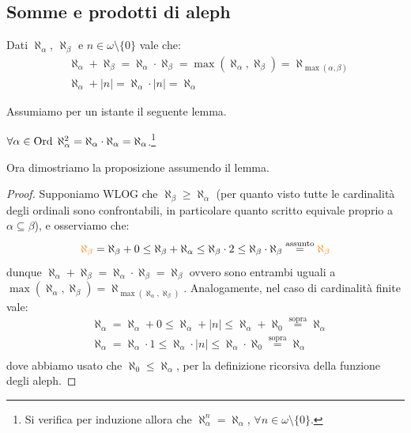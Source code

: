 \subsection{Somme e prodotti di aleph}

\begin{proposition}
	Dati $\aleph_\alpha$, $\aleph_\beta$ e $n \in \omega\setminus\{0\}$ vale che:
	\begin{align*}
		& \aleph_\alpha + \aleph_\beta = \aleph_\alpha \cdot\aleph_\beta = \max(\aleph_\alpha,\aleph_\beta) = \aleph_{\max(\alpha,\beta)} \\
		& \aleph_\alpha + |n| = \aleph_\alpha \cdot |n| = \aleph_\alpha
	\end{align*}
\end{proposition}

Assumiamo per un istante il seguente lemma.

\begin{lemma}[$\aleph_\alpha \cdot \aleph_\alpha = \aleph_\alpha$]
	$\forall \alpha \in \operatorname{Ord} \; \aleph_{\alpha}^2 = \aleph_\alpha \cdot \aleph_\alpha = \aleph_\alpha$.\footnote{Si verifica per induzione allora che $\aleph_\alpha^n = \aleph_\alpha$, $\forall n \in \omega\setminus\{0\}$.}
\end{lemma}

Ora dimostriamo la proposizione assumendo il lemma.

\begin{proof}
	Supponiamo WLOG che $\aleph_\beta \geq \aleph_\alpha$ (per quanto visto tutte le cardinalit\`a degli ordinali sono confrontabili, in particolare quanto scritto equivale proprio a $\alpha \subseteq \beta$), e osserviamo che:
	\[ \textcolor{orange}{\aleph_\beta} = \aleph_\beta + 0 \leq \aleph_\beta + \aleph_\alpha \leq \aleph_\beta \cdot 2 \leq \aleph_\beta \cdot \aleph_\beta \overset{\text{assunto}}{=} \textcolor{orange}{\aleph_\beta}
		\]
	dunque $\aleph_\alpha + \aleph_\beta = \aleph_\alpha \cdot\aleph_\beta = \aleph_\beta$ ovvero sono entrambi uguali a $ \max(\aleph_\alpha,\aleph_\beta) = \aleph_{\max(\aleph_\alpha,\aleph_\beta)}$.
	Analogamente, nel caso di cardinalit\`a finite vale:
	\begin{align*}
		&\aleph_\alpha = \aleph_\alpha + 0 \leq \aleph_\alpha + |n| \leq \aleph_\alpha + \aleph_0 \overset{\text{sopra}}{=} \aleph_\alpha \\
		&\aleph_\alpha = \aleph_\alpha \cdot 1 \leq \aleph_\alpha \cdot |n| \leq \aleph_\alpha \cdot \aleph_0 \overset{\text{sopra}}{=} \aleph_\alpha \\
	\end{align*}
	dove abbiamo usato che $\aleph_0 \leq \aleph_\alpha$, per la definizione ricorsiva della funzione degli aleph.
\end{proof}

